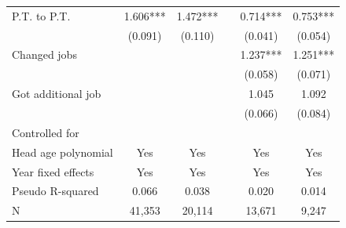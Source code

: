\begin{center}
\begin{threeparttable}
\begin{tabular}{lccccc}
\hspace{.1in}P.T. to P.T.              &       1.606***&       1.472***&&       0.714***&       0.753*** \\
                                       &     (0.091)   &     (0.110)   &&     (0.041)   &     (0.054)    \\
\hspace{.1in}Changed jobs              &               &               &&       1.237***&       1.251*** \\
                                       &               &               &&     (0.058)   &     (0.071)    \\
\hspace{.1in}Got additional job        &               &               &&       1.045   &       1.092    \\
                                       &               &               &&     (0.066)   &     (0.084)    \\
Controlled for                         &               &               &&               &               \\[1ex]
\hspace{.1in} Head age polynomial      & Yes           & Yes           &&  Yes          &  Yes          \\
\hspace{.1in} Year fixed effects       & Yes           & Yes           &&  Yes          &  Yes          \\[1ex]
Pseudo R-squared                       & 0.066         & 0.038         &&  0.020        &  0.014        \\
N                                      &       41,353  &       20,114  &&      13,671   &       9,247   \\ \hline
\end{tabular}
\begin{tablenotes}
\item[] \footnotesize{}
\end{tablenotes}
\label{sum}
\end{threeparttable}
\end{center}

\clearpage

